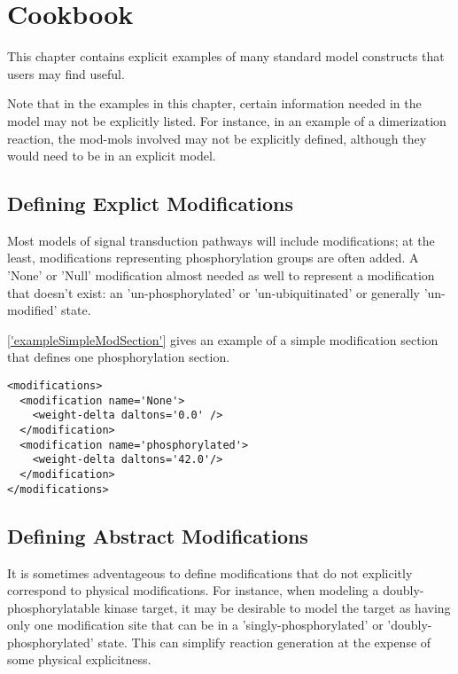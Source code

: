\chapter{Cookbook}

This chapter contains explicit examples of many standard model
constructs that users may find useful.

Note that in the examples in this chapter, certain information needed
in the model may not be explicitly listed.  For instance, in an
example of a dimerization reaction, the mod-mols involved may not be
explicitly defined, although they would need to be in an explicit model.

\section{Defining Explict Modifications}

Most models of signal transduction pathways will include
modifications; at the least, modifications representing
phosphorylation groups are often added.  A 'None' or 'Null'
modification almost needed as well to represent a modification that
doesn't exist: an 'un-phosphorylated' or 'un-ubiquitinated' or
generally 'un-modified' state.

\ref{'exampleSimpleModSection'} gives an example of a simple
modification section that defines one phosphorylation section.

\begin{lstlisting}[caption='Example of a simple modification section', label='exampleSimpleModSection']
<modifications>
  <modification name='None'>
    <weight-delta daltons='0.0' />
  </modification>
  <modification name='phosphorylated'>
    <weight-delta daltons='42.0'/>
  </modification>
</modifications>
\end{lstlisting}

\section{Defining Abstract Modifications}

It is sometimes adventageous to define modifications that do not
explicitly correspond to physical modifications. For instance, when
modeling a doubly-phosphorylatable kinase target, it may be desirable
to model the target as having only one modification site that can be
in a 'singly-phosphorylated' or 'doubly-phosphorylated' state.  This
can simplify reaction generation at the expense of some physical
explicitness.  

